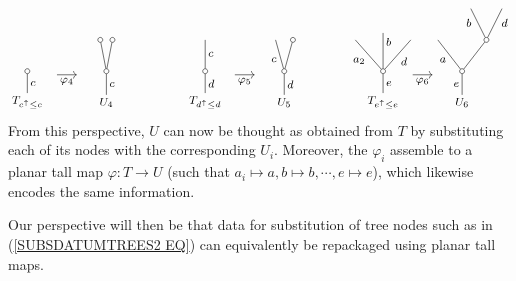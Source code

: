 \documentclass[a4paper,10pt]{article}%
\begin{document}
\begin{example}
\begin{equation}
\begin{tikzpicture}[grow=up,auto,level distance=2.25em,
      every node/.style = {font=\footnotesize, inner sep=2pt},
      dummy/.style={circle,draw,inner sep=0pt,minimum size=1.25mm}]
      \begin{scope}[yshift=-2.55cm]
        \node at (0,0) {$T_{c^{\uparrow}\leq c}$}
        child{node [dummy] {}
          edge from parent node [swap] {$c$}};
	\begin{scope}
          \tikzstyle{level 2}=[sibling distance=0.875em]%
          \node at (2,0) {$U_4$}
          child{node [dummy] {}
            child{node [dummy] {}}
            child{node [dummy] {}}
            edge from parent node  [swap]{$c$}};
	\end{scope}
	\draw [->] (0.75,0.7) -- node [swap]{$\varphi_4$} (1.25,0.7);
        \node at (4.5,0) {$T_{d^{\uparrow}\leq d}$}
        child{node [dummy] {}
          child{
            edge from parent node [swap] {$c$}}
          edge from parent node [swap] {$d$}};
	\begin{scope}
          \tikzstyle{level 2}=[sibling distance=1.25em]%
          \node at (6.5,0) {$U_5$}
          child{node [dummy] {}
            child{node[dummy] {}}
            child{
              edge from parent node {$c$}}
            edge from parent node [swap] {$d$}};
	\end{scope}
	\draw [->] (5.25,0.7) -- node [swap]{$\varphi_5$} (5.75,0.7);
	\begin{scope}
          \tikzstyle{level 2}=[sibling distance=2em]%
          \node at (9,0) {$T_{e^{\uparrow}\leq e}$}
          child{node [dummy] {}
            child{ edge from parent node [swap] {$d$} }
            child[level distance=2.75em]{ edge from parent node [near end,swap] {$b$} }
            child{ edge from parent node {$a_2$} }
            edge from parent node [swap] {$e$}};
	\end{scope}
	\begin{scope}
          \tikzstyle{level 2}=[sibling distance=3.5em]%
          \tikzstyle{level 3}=[sibling distance=2.25em]%
          \node at (11,0) {$U_6$}
          child{node [dummy] {}
            child{node [dummy] {}
              child{ edge from parent node [swap,near end] {$d$} }
              child{ edge from parent node [near end]{$b$} }
            }
            child{ edge from parent node {$a$} }
            edge from parent node {$e$}};
	\end{scope}
	\draw [->] (9.75,0.7) -- node [swap]{$\varphi_6$} (10.25,0.7);
      \end{scope}
    \end{tikzpicture}
  \end{equation}
  From this perspective, $U$ can now be thought as obtained from $T$ by substituting each of its nodes with the corresponding $U_i$. Moreover, the $\varphi_i$ assemble to a planar tall map 
  $\varphi \colon T \to U$ (such that $a_i \mapsto a,b \mapsto b,\cdots,e \mapsto e$), which likewise encodes the same information.

  Our perspective will then be that data for substitution of tree nodes such as in (\ref{SUBSDATUMTREES2 EQ}) can equivalently be 
  repackaged using planar tall maps. 
\end{example}
\end{document}
